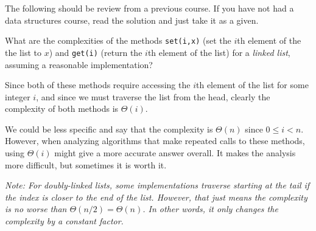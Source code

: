 The following should be review from a previous course. If you have not 
had a data structures course, read the solution and just take it as a given.

\begin{ques}
What are the complexities of the methods 
\verb+set(i,x)+ (set the $i$th element of the the list to $x$) and 
\verb+get(i)+ (return the $i$th element of the list) for a
{\em linked list}, assuming a reasonable implementation?

\noindent
\answerlinetwo
\begin{answer}
Since both of these methods require accessing the $i$th element of the list
for some integer $i$, and since we must traverse the list from the head, clearly
the complexity of both methods is $\Theta(i)$.
  
We could be less specific and say that the complexity is $\Theta(n)$ since $0\leq i <n$.  
However, when analyzing algorithms that make repeated calls to these methods,
using $\Theta(i)$ might give a more accurate answer overall.  It makes the analysis 
more difficult, but sometimes it is worth it.

{\em Note: For doubly-linked lists, 
some implementations traverse starting at the tail if the index is closer to the end
of the list.  However, that just means the complexity is no worse than $\Theta(n/2)=\Theta(n)$.
In other words, it only changes the complexity by a constant factor.}
\end{answer}
\end{ques}

